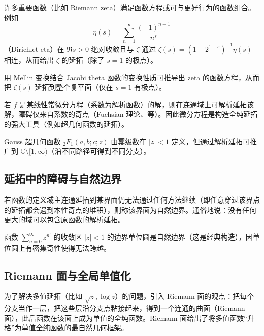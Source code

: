 \documentclass[lang=cn,10pt]{elegantbook}
\begin{document}
	\begin{definition}
		许多重要函数（比如 Riemann zeta）满足函数方程或可与更好行为的函数组合。例如
		\[
		\eta(s)=\sum_{n=1}^\infty\frac{(-1)^{n-1}}{n^s}
		\]
		（Dirichlet eta）在 \(\Re s>0\) 绝对收敛且与 \(\zeta\) 通过 \(\zeta(s)=(1-2^{1-s})^{-1}\eta(s)\) 相连，从而给出 \(\zeta\) 的延拓（除了 \(s=1\) 的极点）。
	\end{definition}
	
	\begin{example}
		用 Mellin 变换结合 Jacobi theta 函数的变换性质可推导出 zeta 的函数方程，从而把 \(\zeta(s)\) 延拓到整个复平面（仅在 \(s=1\) 有极点）。
	\end{example}
	
	\begin{definition}
		若 \(f\) 是某线性常微分方程（系数为解析函数）的解，则在连通域上可解析延拓该解，障碍仅来自系数的奇点（Fuchsian 理论、等）。因此微分方程是构造全纯延拓的强大工具（例如超几何函数的延拓）。
	\end{definition}
	
	\begin{example}
		Gauss 超几何函数 \({}_2F_1(a,b;c;z)\) 由幂级数在 \(|z|<1\) 定义，但通过解析延拓可推广到 \( \mathbb C\setminus[1,\infty)\)（沿不同路径可得到不同分支）。
	\end{example}
	
	\subsection*{延拓中的障碍与自然边界}
	
	\begin{definition}
		若函数的定义域主连通延拓到某界面仍无法通过任何方法继续（即任意穿过该界点的延拓都会遇到本性奇点的堆积），则称该界面为自然边界。通俗地说：没有任何更大的域可以包含原函数的解析延拓。
	\end{definition}
	
	\begin{example}
		函数 \(\sum_{n=0}^\infty z^{n!}\) 的收敛区 \(|z|<1\) 的边界单位圆是自然边界（这是经典构造），因单位圆上有密集奇性使得无法跨越。
	\end{example}
	
	\subsection*{Riemann 面与全局单值化}
	为了解决多值延拓（比如 \(\sqrt{z},\log z\)）的问题，引入 Riemann 面的观点：把每个分支当作一层，把这些层沿分支点粘接起来，得到一个连通的曲面（Riemann 面），此后函数在该面上成为单值的全纯函数。Riemann 面给出了将多值函数“升格”为单值全纯函数的最自然几何框架。
	
\end{document}

